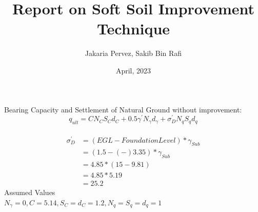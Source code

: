 \documentclass[12pt, a4paper]{article}
\title{Report on Soft Soil Improvement Technique}
\author{Jakaria Pervez, Sakib Bin Rafi}
\date{April, 2023}
\begin{document}
\maketitle
Bearing Capacity and Settlement of Natural Ground without improvement:
\[q_{ult}=CN_CS_Cd_C+0.5{\gamma^'}{N_\gamma}{d_\gamma}+{\sigma_D^'}{N_q}{S_q}{d_q}\]\\
\begin{align*}
   \sigma{_D^'} &=(EGL-Foundation Level)*\gamma_{Sub}\\
  & =(1.5-(-)3.35)*\gamma_{Sub}\\
  & =4.85*(15-9.81)\\
  & =4.85*5.19\\
  & =25.2
\end{align*}
Assumed Values\\
$N_\gamma=0, C=5.14, S_C=d_C=1.2, N_q=S_q=d_q=1$
\end{document}
